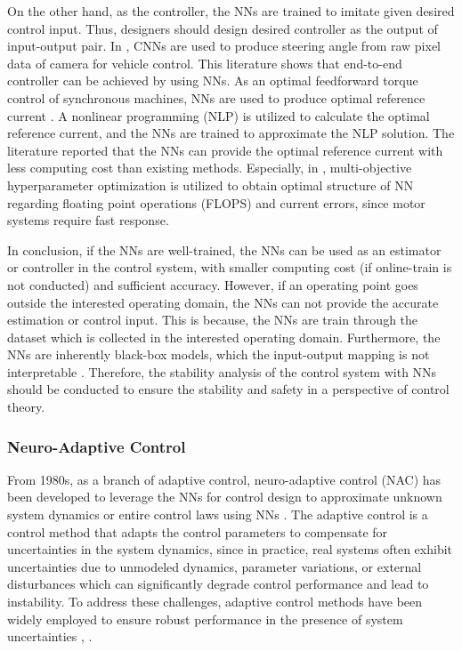 On the other hand, as the controller, the NNs are trained to imitate given desired control input.
Thus, designers should design desired controller as the output of input-output pair.
In \cite{RN117, RN116}, CNNs are used to produce steering angle from raw pixel data of camera for vehicle control.
This literature shows that end-to-end controller can be achieved by using NNs. 
As an optimal feedforward torque control of synchronous machines, NNs are used to produce optimal reference current \cite{RN112, RN113, RN114}.
A nonlinear programming (NLP) is utilized to calculate the optimal reference current, and the NNs are trained to approximate the NLP solution.
The literature reported that the NNs can provide the optimal reference current with less computing cost than existing methods.
Especially, in \cite{RN114}, multi-objective hyperparameter optimization is utilized to obtain optimal structure of NN regarding floating point operations (FLOPS) and current errors, since motor systems require fast response.

In conclusion, if the NNs are well-trained, the NNs can be used as an estimator or controller in the control system, with smaller computing cost (if online-train is not conducted) and sufficient accuracy.
However, if an operating point goes outside the interested operating domain, the NNs can not provide the accurate estimation or control input.
This is because, the NNs are train through the dataset which is collected in the interested operating domain.
Furthermore, the NNs are inherently black-box models, which the input-output mapping is not interpretable \cite{RN16, RN17}.
Therefore, the stability analysis of the control system with NNs should be conducted to ensure the stability and safety in a perspective of control theory.

\subsubsection{Neuro-Adaptive Control}

From 1980s, as a branch of adaptive control, neuro-adaptive control (NAC) has been developed to leverage the NNs for control design to approximate unknown system dynamics or entire control laws using NNs \cite{RN5, RN48}.
The adaptive control is a control method that adapts the control parameters to compensate for uncertainties in the system dynamics, since in practice, real systems often exhibit uncertainties due to unmodeled dynamics, parameter variations, or external disturbances which can significantly degrade control performance and lead to instability. 
To address these challenges, adaptive control methods have been widely employed to ensure robust performance in the presence of system uncertainties \cite{RN6}, \cite{RN10}. 

